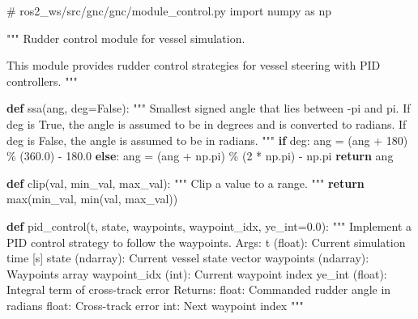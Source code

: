 \documentclass[
  letterpaper,
  DIV=11,
  numbers=noendperiod]{scrreprt}
\newenvironment{Shaded}{\begin{snugshade}}{\end{snugshade}}
\newcommand{\BuiltInTok}[1]{\textcolor[rgb]{0.00,0.23,0.31}{#1}}
\newcommand{\CommentTok}[1]{\textcolor[rgb]{0.37,0.37,0.37}{#1}}
\newcommand{\ControlFlowTok}[1]{\textcolor[rgb]{0.00,0.23,0.31}{\textbf{#1}}}
\newcommand{\DecValTok}[1]{\textcolor[rgb]{0.68,0.00,0.00}{#1}}
\newcommand{\FloatTok}[1]{\textcolor[rgb]{0.68,0.00,0.00}{#1}}
\newcommand{\ImportTok}[1]{\textcolor[rgb]{0.00,0.46,0.62}{#1}}
\newcommand{\KeywordTok}[1]{\textcolor[rgb]{0.00,0.23,0.31}{\textbf{#1}}}
\newcommand{\NormalTok}[1]{\textcolor[rgb]{0.00,0.23,0.31}{#1}}
\newcommand{\OperatorTok}[1]{\textcolor[rgb]{0.37,0.37,0.37}{#1}}
\newcommand{\VariableTok}[1]{\textcolor[rgb]{0.07,0.07,0.07}{#1}}
\begin{document}
\begin{Shaded}
\begin{Highlighting}[]
\CommentTok{\# ros2\_ws/src/gnc/gnc/module\_control.py}
\ImportTok{import}\NormalTok{ numpy }\ImportTok{as}\NormalTok{ np}

\CommentTok{"""}
\CommentTok{Rudder control module for vessel simulation.}

\CommentTok{This module provides rudder control strategies for vessel steering with PID controllers.}
\CommentTok{"""}

\KeywordTok{def}\NormalTok{ ssa(ang, deg}\OperatorTok{=}\VariableTok{False}\NormalTok{):}
    \CommentTok{"""}
\CommentTok{    Smallest signed angle that lies between {-}pi and pi.}
\CommentTok{    If deg is True, the angle is assumed to be in degrees and is converted to radians.}
\CommentTok{    If deg is False, the angle is assumed to be in radians.}
\CommentTok{    """}
    \ControlFlowTok{if}\NormalTok{ deg:}
\NormalTok{        ang }\OperatorTok{=}\NormalTok{ (ang }\OperatorTok{+} \DecValTok{180}\NormalTok{) }\OperatorTok{\%}\NormalTok{ (}\FloatTok{360.0}\NormalTok{) }\OperatorTok{{-}} \FloatTok{180.0}
    \ControlFlowTok{else}\NormalTok{:}
\NormalTok{        ang }\OperatorTok{=}\NormalTok{ (ang }\OperatorTok{+}\NormalTok{ np.pi) }\OperatorTok{\%}\NormalTok{ (}\DecValTok{2} \OperatorTok{*}\NormalTok{ np.pi) }\OperatorTok{{-}}\NormalTok{ np.pi}
    \ControlFlowTok{return}\NormalTok{ ang}

\KeywordTok{def}\NormalTok{ clip(val, min\_val, max\_val):}
    \CommentTok{"""}
\CommentTok{    Clip a value to a range.}
\CommentTok{    """}
    \ControlFlowTok{return} \BuiltInTok{max}\NormalTok{(min\_val, }\BuiltInTok{min}\NormalTok{(val, max\_val))}

\KeywordTok{def}\NormalTok{ pid\_control(t, state, waypoints, waypoint\_idx, ye\_int}\OperatorTok{=}\FloatTok{0.0}\NormalTok{):}
    \CommentTok{"""}
\CommentTok{    Implement a PID control strategy to follow the waypoints. }
\CommentTok{    }
\CommentTok{    Args:}
\CommentTok{        t (float): Current simulation time [s]}
\CommentTok{        state (ndarray): Current vessel state vector}
\CommentTok{        waypoints (ndarray): Waypoints array}
\CommentTok{        waypoint\_idx (int): Current waypoint index}
\CommentTok{        ye\_int (float): Integral term of cross{-}track error}
\CommentTok{        }
\CommentTok{    Returns:}
\CommentTok{        float: Commanded rudder angle in radians}
\CommentTok{        float: Cross{-}track error}
\CommentTok{        int: Next waypoint index}
\CommentTok{    """}


\end{Highlighting}
\end{Shaded}
\end{document}
